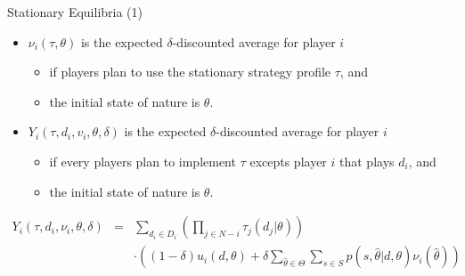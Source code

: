 \begin{frame}{Stationary Equilibria (1)}
    \begin{itemize}
        \item $\nu_i(\tau, \theta)$ is the expected $\delta$-discounted average for player $i$
        \begin{itemize}
            \item if players plan to use the stationary strategy profile $\tau$, and 
            \item the initial state of nature is $\theta$.
        \end{itemize}
        \item $Y_i(\tau, d_i, v_i, \theta, \delta)$ is the expected $\delta$-discounted average for
        player $i$
        \begin{itemize}
            \item if every players plan to implement $\tau$ excepts player $i$ that plays $d_i$, and
            \item the initial state of nature is $\theta$.
        \end{itemize}
    \end{itemize}

    \begin{small}
        \begin{eqnarray}
            Y_i(\tau, d_i, \nu_i, \theta, \delta) &=&
            \sum_{d_i \in D_i} \left( \prod_{j \in N-i} \tau_j(d_j|\theta) \right) \nonumber \\
            && \cdot  \left(  (1-\delta) u_i(d,\theta) + \delta \sum_{\hat{\theta} \in \Theta}
            \sum_{s \in S} p(s,\hat{\theta} |d,\theta) \nu_i (\hat{\theta}) \right)
        \end{eqnarray}  
    \end{small}
\end{frame}

